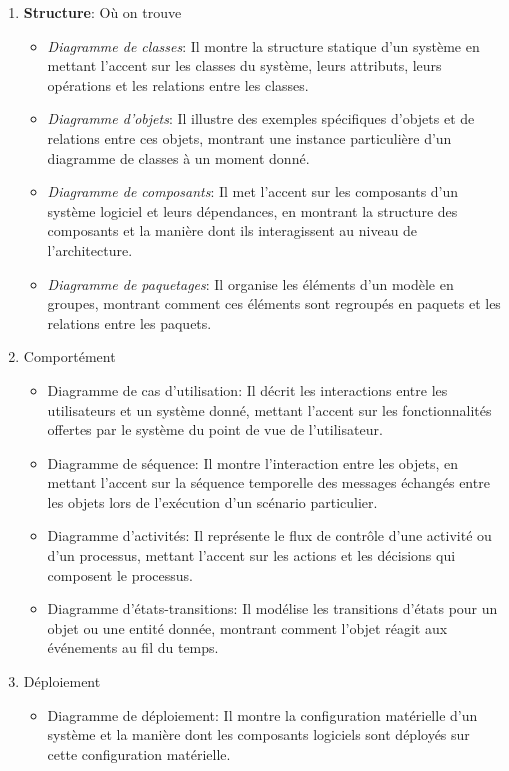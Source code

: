 \begin{enumerate}
    \item \textbf{Structure}: Où on trouve
    \begin{itemize}
        \item \emph{Diagramme de classes}: Il montre la structure statique d'un système en mettant l'accent sur les classes du système, leurs attributs, leurs opérations et les relations entre les classes.
        \item \emph{Diagramme d'objets}: Il illustre des exemples spécifiques d'objets et de relations entre ces objets, montrant une instance particulière d'un diagramme de classes à un moment donné.
        \item \emph{Diagramme de composants}: Il met l'accent sur les composants d'un système logiciel et leurs dépendances, en montrant la structure des composants et la manière dont ils interagissent au niveau de l'architecture.
        \item \emph{Diagramme de paquetages}: Il organise les éléments d'un modèle en groupes, montrant comment ces éléments sont regroupés en paquets et les relations entre les paquets.
    \end{itemize}
    \item Comportément
    \begin{itemize}
        \item Diagramme de cas d'utilisation: Il décrit les interactions entre les utilisateurs et un système donné, mettant l'accent sur les fonctionnalités offertes par le système du point de vue de l'utilisateur.
        \item Diagramme de séquence: Il montre l'interaction entre les objets, en mettant l'accent sur la séquence temporelle des messages échangés entre les objets lors de l'exécution d'un scénario particulier.
        \item Diagramme d'activités: Il représente le flux de contrôle d'une activité ou d'un processus, mettant l'accent sur les actions et les décisions qui composent le processus.
        \item Diagramme d'états-transitions: Il modélise les transitions d'états pour un objet ou une entité donnée, montrant comment l'objet réagit aux événements au fil du temps.
    \end{itemize}
    \item Déploiement
    \begin{itemize}
        \item Diagramme de déploiement: Il montre la configuration matérielle d'un système et la manière dont les composants logiciels sont déployés sur cette configuration matérielle.
    \end{itemize}
\end{enumerate}

